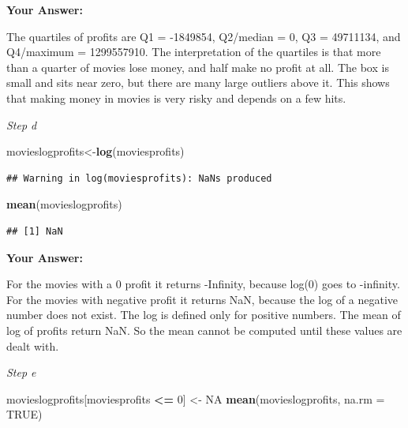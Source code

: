 \documentclass[
]{article}
\newenvironment{Shaded}{\begin{snugshade}}{\end{snugshade}}
\newcommand{\AttributeTok}[1]{\textcolor[rgb]{0.13,0.29,0.53}{#1}}
\newcommand{\ConstantTok}[1]{\textcolor[rgb]{0.56,0.35,0.01}{#1}}
\newcommand{\DecValTok}[1]{\textcolor[rgb]{0.00,0.00,0.81}{#1}}
\newcommand{\FunctionTok}[1]{\textcolor[rgb]{0.13,0.29,0.53}{\textbf{#1}}}
\newcommand{\NormalTok}[1]{#1}
\newcommand{\OtherTok}[1]{\textcolor[rgb]{0.56,0.35,0.01}{#1}}
\newcommand{\SpecialCharTok}[1]{\textcolor[rgb]{0.81,0.36,0.00}{\textbf{#1}}}
\begin{document}
\textbf{Your Answer:}

The quartiles of profits are Q1 = -1849854, Q2/median = 0, Q3 =
49711134, and Q4/maximum = 1299557910. The interpretation of the
quartiles is that more than a quarter of movies lose money, and half
make no profit at all. The box is small and sits near zero, but there
are many large outliers above it. This shows that making money in movies
is very risky and depends on a few hits.

\emph{Step d}

\begin{Shaded}
\begin{Highlighting}[]
\NormalTok{movieslogprofits}\OtherTok{\textless{}{-}}\FunctionTok{log}\NormalTok{(moviesprofits)}
\end{Highlighting}
\end{Shaded}

\begin{verbatim}
## Warning in log(moviesprofits): NaNs produced
\end{verbatim}

\begin{Shaded}
\begin{Highlighting}[]
\FunctionTok{mean}\NormalTok{(movieslogprofits)}
\end{Highlighting}
\end{Shaded}

\begin{verbatim}
## [1] NaN
\end{verbatim}

\textbf{Your Answer:}

For the movies with a 0 profit it returns -Infinity, because log(0) goes
to -infinity. For the movies with negative profit it returns NaN,
because the log of a negative number does not exist. The log is defined
only for positive numbers. The mean of log of profits return NaN. So the
mean cannot be computed until these values are dealt with.

\emph{Step e}

\begin{Shaded}
\begin{Highlighting}[]
\NormalTok{movieslogprofits[moviesprofits }\SpecialCharTok{\textless{}=} \DecValTok{0}\NormalTok{] }\OtherTok{\textless{}{-}} \ConstantTok{NA}
\FunctionTok{mean}\NormalTok{(movieslogprofits, }\AttributeTok{na.rm =} \ConstantTok{TRUE}\NormalTok{)}
\end{Highlighting}
\end{Shaded}
\end{document}
